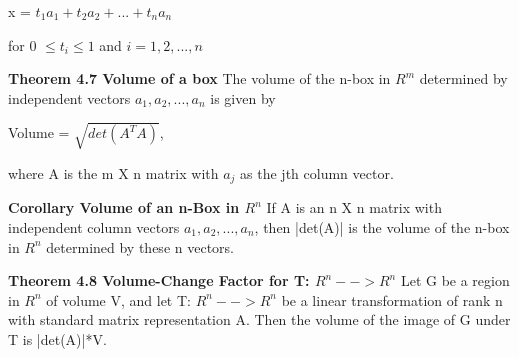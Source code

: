 \documentclass{article}
\begin{document}
\begin{center}
x = $t_1 a_1 + t_2 a_2 + ... + t_n a_n$

\end{center}

for 0 $\leq t_i \leq 1 $ and $i = 1,2,...,n$

\textbf {Theorem 4.7 Volume of a box} The volume of the n-box in $R^m$ determined by independent vectors $a_1, a_2,..., a_n$ is given by 

\begin{center}
Volume = $\sqrt{det(A^TA)}$,

\end{center}

where A is the m X n matrix with $a_j$ as the jth column vector.

\textbf {Corollary Volume of an n-Box in $R^n$} If A is an n X n matrix with independent column vectors $a_1, a_2,..., a_n$, then |det(A)| is the volume of the n-box in $R^n$ determined by these n vectors.

\textbf{Theorem 4.8 Volume-Change Factor for T: $R^n --> R^n$} Let G be a region in $R^n$ of volume V, and let T: $R^n --> R^n$ be a linear transformation of rank n with standard matrix representation A. Then the volume of the image of G under T is |det(A)|*V.
\end{document}
